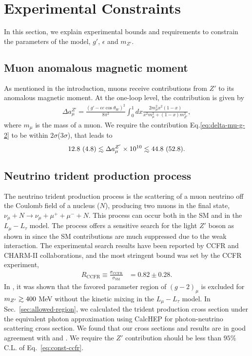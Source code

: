 \documentclass[preprint,amsmath,amssymb,superscriptaddress,nofootinbib]{revtex4}
\newcommand{\lsim}{\raise0.3ex\hbox{$\;<$\kern-0.75em\raise-1.1ex\hbox{$\sim\;$}}}
\newcommand{\gsim}{\raise0.3ex\hbox{$\;>$\kern-0.75em\raise-1.1ex\hbox{$\sim\;$}}}
\begin{document}
\section{Experimental Constraints} \label{sec:constraints}
In this section, we explain experimental bounds and requirements to constrain the parameters of the model, $g'$, $\epsilon$ 
and $m_{Z'}$.

\subsection{Muon anomalous magnetic moment}
As mentioned in the introduction, muons receive contributions from $Z'$ to its anomalous magnetic 
moment. At the one-loop level, the contribution is given by
\begin{align}
\Delta a_\mu^{Z'} = \frac{(g'-\epsilon e \cos\theta_W)^2}{8 \pi^2} \int^1_0 dx \frac{2 m_\mu^2 x^2 (1-x)}{x^2 m_\mu^2 + (1-x)m_{Z'}^2},
\label{eq:delta-mu-g-2}
\end{align}
where $m_\mu$ is the mass of a muon. We require the contribution Eq.\eqref{eq:delta-mu-g-2}
to be within $2\sigma$($3\sigma$), that leads to
\begin{align}
12.8~(4.8) \lsim \Delta a_\mu^{Z'} \times 10^{10} \lsim 44.8~(52.8).
\end{align}

\subsection{Neutrino trident production process}
The neutrino trident production process is the scattering of a muon neutrino off the Coulomb field of a nucleus ($N$),  
producing two muons in the final state, $\nu_\mu + N \rightarrow \nu_\mu + \mu^+ + \mu^- + N$.
This process can occur both in the SM and in the
$L_\mu - L_\tau$ model. The process offers a sensitive search for the light $Z'$ boson as shown 
in \cite{Altmannshofer:2014pba, Magill:2016hgc} since the SM contributions are much suppressed due to the weak 
interaction. 
The experimental search results 
have been reported by CCFR \cite{Mishra:1991bv} and CHARM-II \cite{Geiregat:1990gz} collaborations, and the 
most stringent bound was set by the CCFR experiment, 
%
\begin{align}
R_{\mathrm{CCFR}} \equiv \frac{\sigma_{\mathrm{CCFR}}}{\sigma_{\mathrm{SM}}} &= 0.82 \pm 0.28. \label{eq:const-ccfr}
\end{align}
%
In \cite{Altmannshofer:2014pba}, it was shown that the favored parameter region of $(g-2)_\mu$ is excluded for $m_{Z'} \gsim 400$ MeV 
without the kinetic mixing in the $L_\mu - L_\tau$ model. In Sec.~\ref{sec:allowed-region}, 
we calculated the trident production cross section under the equivalent 
photon approximation \cite{vonWeizsacker:1934nji, Williams:1934ad} 
using CalcHEP \cite{Belyaev:2012qa} for photon-neutrino scattering cross section. 
We found that our cross sections and results are in good agreement with \cite{Brown:1973ih} and \cite{Altmannshofer:2014pba}. 
We require the $Z'$ contribution should be less than $95$\% C.L. of Eq.~\eqref{eq:const-ccfr}. 
\end{document}

